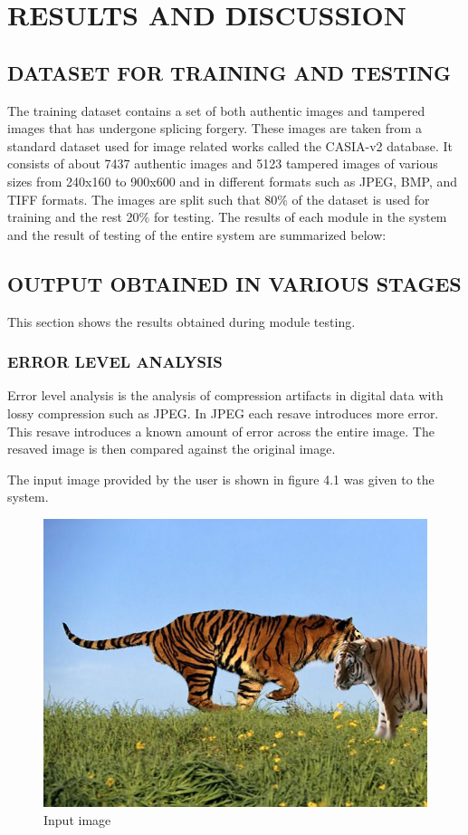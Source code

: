 
\chapter{RESULTS AND DISCUSSION} %

\section{DATASET FOR TRAINING AND TESTING}
       The training dataset contains a set of both authentic images and tampered images that has undergone splicing forgery. These images are taken from a standard dataset used for image related works called  the CASIA-v2 database. It consists of about 7437 authentic images and 5123 tampered images of various sizes from 240x160 to 900x600 and in different formats such as JPEG, BMP, and TIFF formats. The images are split such that 80\% of the dataset is used for training and the rest 20\% for testing. The results of each module in the system and the result of testing of the entire system are summarized below:
\linebreak
\section{OUTPUT OBTAINED IN VARIOUS STAGES}
This section shows the results obtained during module testing.

\subsection{ERROR LEVEL ANALYSIS}
Error level analysis is the analysis of compression artifacts in digital data with lossy compression such as JPEG. In JPEG each resave introduces more error. This resave introduces a known amount of error across the entire image. The resaved image is then compared against the original image. 

The input image provided by the user is shown in figure 4.1 was given to the system.


\begin{figure}[h!]
\centering
\includegraphics[width=12cm]{Figures/tiger.jpg}
\caption{Input image}
\label{fig:lion}
\end{figure}


